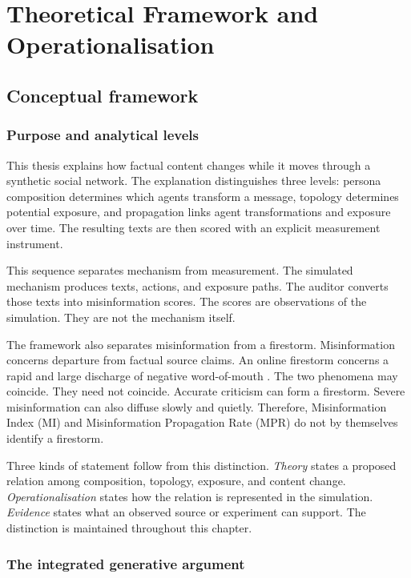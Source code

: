\chapter{Theoretical Framework and Operationalisation}
\label{chap:theory}

\section{Conceptual framework}
\label{sec:theory}

\subsection{Purpose and analytical levels}

This thesis explains how factual content changes while it moves through a synthetic social network.
The explanation distinguishes three levels: persona composition determines which agents transform a message, topology determines potential exposure, and propagation links agent transformations and exposure over time.
The resulting texts are then scored with an explicit measurement instrument.

This sequence separates mechanism from measurement.
The simulated mechanism produces texts, actions, and exposure paths.
The auditor converts those texts into misinformation scores.
The scores are observations of the simulation.
They are not the mechanism itself.

The framework also separates misinformation from a firestorm.
Misinformation concerns departure from factual source claims.
An online firestorm concerns a rapid and large discharge of negative word-of-mouth \parencite{pfeffer2014firestorms}.
The two phenomena may coincide.
They need not coincide.
Accurate criticism can form a firestorm.
Severe misinformation can also diffuse slowly and quietly.
Therefore, Misinformation Index (MI) and Misinformation Propagation Rate (MPR) do not by themselves identify a firestorm.

Three kinds of statement follow from this distinction.
\emph{Theory} states a proposed relation among composition, topology, exposure, and content change.
\emph{Operationalisation} states how the relation is represented in the simulation.
\emph{Evidence} states what an observed source or experiment can support.
The distinction is maintained throughout this chapter.

\subsection{The integrated generative argument}
\label{subsec:integrated-causal-argument}

